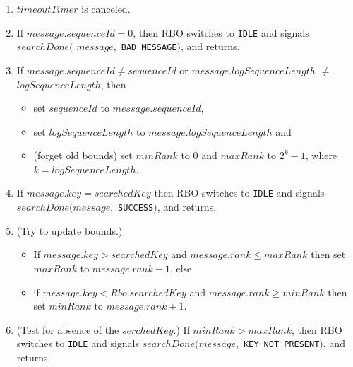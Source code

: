 \documentclass{llncs}
\begin{document}
\begin{enumerate}
\item $timeoutTimer$ is canceled.

\item
  If $message.sequenceId=0$,
  then RBO switches to \verb|IDLE| and signals $searchDone($ $message,$ \verb|BAD_MESSAGE|$)$,
  and returns.

\item
  If $message.sequenceId\not=sequenceId$ or $message.logSequenceLength$ $\not=$ $logSequenceLength$, 
  then
  \begin{itemize}
  \item
    set $sequenceId$ to $message.sequenceId$,
  \item
    set $logSequenceLength$ to $message.logSequenceLength$ and
  \item
    (forget old bounds) set $minRank$ to $0$ and $maxRank$ to $2^{k}-1$, where $k=logSequenceLength$.
  \end{itemize}

\item
  If $message.key=searchedKey$ then RBO switches to \verb|IDLE| and signals $searchDone(message,$ \verb|SUCCESS|$)$,
  and returns.

\item (Try to update bounds.)
  \begin{itemize}
  \item
    If $message.key>searchedKey$ and $message.rank\le maxRank$ then set $maxRank$ to $message.rank-1$,
    else
  \item
    if $message.key<Rbo.searchedKey$ and $message.rank\ge minRank$ then set $minRank$ to $message.rank+1$.
  \end{itemize}

\item
  (Test for absence of the $serchedKey$.)
  If $minRank>maxRank$, then  RBO switches to \verb|IDLE| and signals $searchDone(message,$ \verb|KEY_NOT_PRESENT|$)$,
  and returns.


\end{enumerate}
\end{document}
